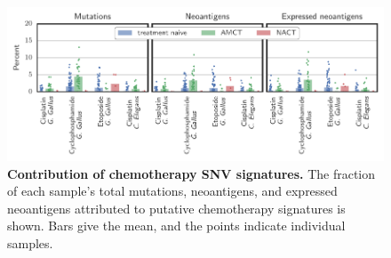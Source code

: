 \begin{figure}[htbp]
\centering
\includegraphics[scale=1.0]{figures/sources_of_mutations_and_neoantigens_ungrouped.pdf}
\caption{\textbf{Contribution of chemotherapy SNV signatures.} The fraction of each sample's total mutations, neoantigens, and expressed neoantigens attributed to putative chemotherapy signatures is shown. Bars give the mean, and the points indicate individual samples.}
\label{fig:sourcesungrouped}
\end{figure}

\FloatBarrier
